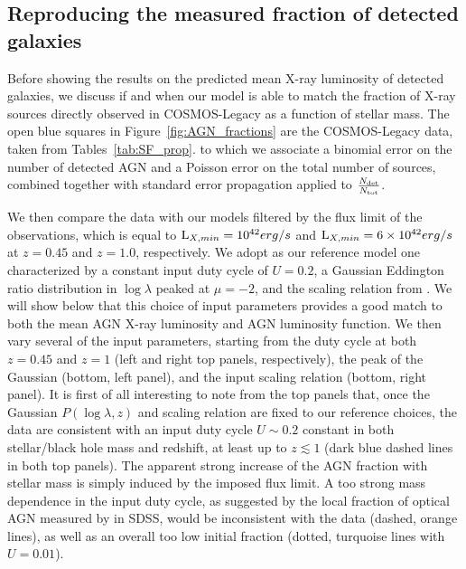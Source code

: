\subsection{Reproducing the measured fraction of detected galaxies} \label{ssec:Fig1}

Before showing the results on the predicted mean X-ray luminosity of detected galaxies,
we discuss if and when our model is able to match the fraction of X-ray sources directly
observed in COSMOS-Legacy as a function of stellar mass. The open blue squares in
Figure~\ref{fig:AGN_fractions} are the COSMOS-Legacy data, taken from Tables~\ref{tab:SF_prop}.
to which we associate a binomial error on the number of detected AGN and a Poisson error
on the total number of sources, combined together with standard error propagation applied to
$\frac{N_{\rm det}}{N_{\rm tot}}$.

We then compare the data with our models filtered by the flux limit of the observations, which is equal to ${\rm L}_{X,min}=10^{42}erg/s$ and ${\rm L}_{X,min}=6\times10^{42}erg/s$ at $z=0.45$ and $z=1.0$, respectively. We adopt as our reference model one characterized by a constant input duty cycle of $U=0.2$, a Gaussian Eddington ratio distribution in $\log\lambda$ peaked at $\mu=-2$, and the \MBHMS{} scaling relation from \cite{2015ApJ...813...82R}. We will show below that this choice of input parameters provides a good match to both the mean AGN X-ray luminosity and AGN luminosity function. We then vary several of the input parameters, starting from the duty cycle at both $z=0.45$ and $z=1$ (left and right top panels, respectively), the peak of the Gaussian \PLz (bottom, left panel), and the input \MBHMS{} scaling relation (bottom, right panel). It is first of all interesting to note from the top panels that, once the Gaussian $P(\log \lambda,z)$ and \MBHMS scaling relation are fixed to our reference choices, the data are consistent with an input duty cycle $U\sim0.2$ constant in both stellar/black hole mass and redshift, at least up to $z\lesssim 1$ (dark blue dashed lines in both top panels). The apparent strong increase of the AGN fraction with stellar mass is simply induced by the imposed flux limit. A too strong mass dependence in the input duty cycle, as suggested by the local fraction of optical AGN measured by \citet{2019MNRAS.488...89M} in SDSS, would be inconsistent with the data (dashed, orange lines), as well as an overall too low initial fraction (dotted, turquoise lines with $U=0.01$). 

